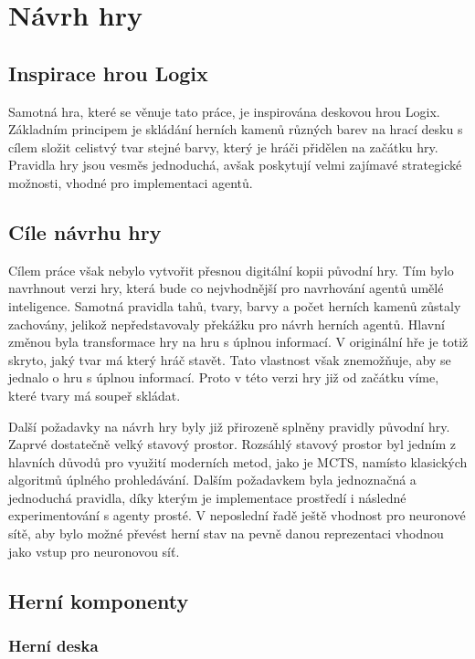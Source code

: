 \chapter{Návrh hry}

\section{Inspirace hrou Logix}

Samotná hra, které se věnuje tato práce, je inspirována deskovou hrou Logix. Základním principem je skládání herních kamenů různých
barev na hrací desku s cílem složit celistvý tvar stejné barvy, který je hráči přidělen na začátku hry. Pravidla hry jsou vesměs jednoduchá,
avšak poskytují velmi zajímavé strategické možnosti, vhodné pro implementaci agentů.

\section{Cíle návrhu hry}

Cílem práce však nebylo vytvořit přesnou digitální kopii původní hry. Tím bylo navrhnout verzi hry, která bude co nejvhodnější 
pro navrhování agentů umělé inteligence. Samotná pravidla tahů, tvary, barvy a počet herních kamenů zůstaly zachovány, jelikož nepředstavovaly
překážku pro návrh herních agentů. Hlavní změnou byla transformace hry na hru s úplnou informací. V originální hře je 
totiž skryto, jaký tvar má který hráč stavět.
Tato vlastnost však znemožňuje, aby se jednalo o hru s úplnou informací. Proto v této verzi hry již od začátku víme, které tvary má soupeř skládat.

Další požadavky na návrh hry byly již přirozeně splněny pravidly původní hry. Zaprvé dostatečně velký stavový prostor. Rozsáhlý stavový prostor byl 
jedním z hlavních důvodů pro využití moderních metod, jako je MCTS, namísto klasických
algoritmů úplného prohledávání. Dalším požadavkem byla jednoznačná a jednoduchá pravidla,
díky kterým je implementace prostředí i následné experimentování s agenty prosté. V neposlední řadě ještě vhodnost pro neuronové sítě, aby bylo možné převést herní
stav na pevně danou reprezentaci vhodnou jako vstup pro neuronovou síť.

\section{Herní komponenty}

\subsection{Herní deska}

